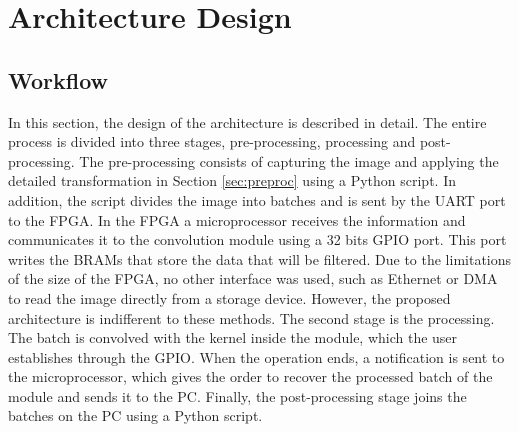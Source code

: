\documentclass[conference,compsoc]{IEEEtran}
\begin{document}

\section{Architecture Design}\label{sec:architecture}

\subsection{Workflow}
In this section, the design of the architecture is described in detail. The
entire process is divided into three stages, pre-processing, processing and
post-processing. The pre-processing consists of capturing the image and applying
the detailed transformation in Section \ref{sec:preproc} using a Python script. In
addition, the script divides the image into batches and is sent by the UART port
to the FPGA\@. In the FPGA a microprocessor receives the information and
communicates it to the convolution module using a 32 bits GPIO port. This port
writes the BRAMs that store the data that will be filtered. Due to the
limitations of the size of the FPGA, no other interface was used, such as
Ethernet or DMA to read the image directly from a storage device. However, the
proposed architecture is indifferent to these methods. The second stage is the
processing. The batch is convolved with the kernel inside the module, which the
user establishes through the GPIO. When the operation ends, a notification is
sent to the microprocessor, which gives the order to recover the processed batch
of the module and sends it to the PC. Finally, the post-processing stage joins
the batches on the PC using a Python script.


\end{document}
